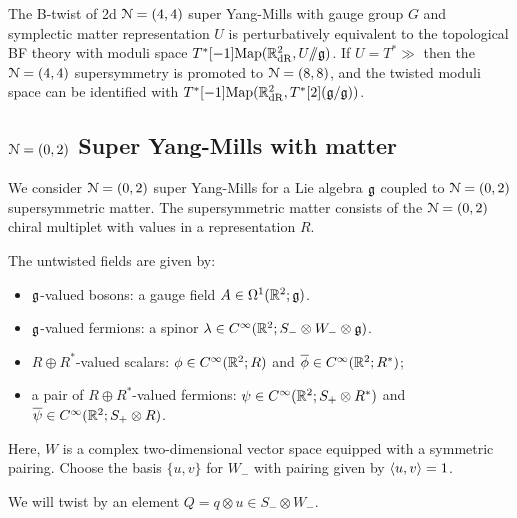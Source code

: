 \documentclass[10pt, oneside]{article}
\newcommand{\ham}{/\!\!/}
\begin{document}
\begin{theorem}
The B-twist of 2d $\mathcal{N}=(4,4)$ super Yang-Mills with gauge group $G$ and symplectic matter representation $U$ is perturbatively equivalent to the topological BF theory with moduli space $T^*[-1]\mr{Map}(\RR^2_{\mr{dR}}, U \ham \gg)$.  If $U = T^*\gg$ then the $\mathcal{N}=(4,4)$ supersymmetry is promoted to $\mathcal{N}=(8,8)$, and the twisted moduli space can be identified with $T^*[-1]\mathrm{Map}(\mathbb R^2_{\mathrm{dR}}, T^*[2](\mathfrak{g}/\mathfrak{g}))$.
\end{theorem}

\subsection{\texorpdfstring{$\mathcal N=(0,2)$}{N=(0,2)} Super Yang-Mills with matter} \label{sect:2d(0,2)}

We consider $\mathcal N=(0,2)$ super Yang-Mills for a Lie algebra $\mathfrak g$ coupled to $\mathcal N=(0,2)$ supersymmetric matter. 
The supersymmetric matter consists of the $\mathcal N = (0,2)$ chiral multiplet with values in a representation $R$. 


The untwisted fields are given by:
\begin{itemize}
\item $\mathfrak g$-valued bosons: a gauge field $A \in \Omega^1(\mathbb R^2;\mathfrak g)$.
\item $\mathfrak g$-valued fermions: a spinor $\lambda \in C^\infty(\mathbb R^2 ; S_- \otimes W_- \otimes \mathfrak g)$. 
\item $R \oplus R^*$-valued scalars: $\phi \in C^\infty(\mathbb R^2 ; R)$ and $\overline{\phi} \in C^\infty(\mathbb R^2 ; R^*)$;
\item a pair of $R \oplus R^*$-valued fermions: $\psi \in C^\infty(\mathbb R^2 ; S_+ \otimes R^*)$  and $\overline{\psi} \in C^\infty(\mathbb R^2 ; S_+ \otimes R)$.
\end{itemize}
Here, $W$ is a complex two-dimensional vector space equipped with a symmetric pairing. 
Choose the basis $\{u,v\}$ for $W_-$ with pairing given by $\langle u, v\rangle = 1$. 

We will twist by an element $Q = q \otimes u \in S_- \otimes W_-$. 
\end{document}
